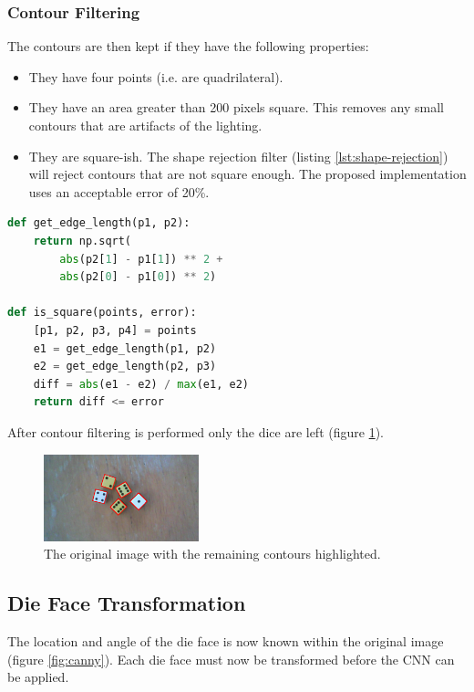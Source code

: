 \documentclass[conference]{IEEEtran}
\begin{document}
\subsubsection{Contour Filtering}
The contours are then kept if they have the following properties:
\begin{itemize}
	\item They have four points (i.e. are quadrilateral).
	\item They have an area greater than 200 pixels square. This removes any small contours that are artifacts of the lighting.
	\item They are square-ish. The shape rejection filter (listing \ref{lst:shape-rejection}) will reject contours that are not square enough.
		The proposed implementation uses an acceptable error of 20\%.
\end{itemize}
\begin{lstlisting}[language=python, caption={The shape rejection filter in Python.}, label={lst:shape-rejection}]
def get_edge_length(p1, p2):
    return np.sqrt(
    	abs(p2[1] - p1[1]) ** 2 +
    	abs(p2[0] - p1[0]) ** 2)

def is_square(points, error):
    [p1, p2, p3, p4] = points
    e1 = get_edge_length(p1, p2)
    e2 = get_edge_length(p2, p3)
    diff = abs(e1 - e2) / max(e1, e2)
    return diff <= error
\end{lstlisting}
After contour filtering is performed only the dice are left (figure \ref{fig:contour}). 
\begin{figure}
	\centering
	\includegraphics[width=0.4\textwidth]{contours}
	\caption{The original image with the remaining contours highlighted.}
	\label{fig:contour}
\end{figure}

\subsection{Die Face Transformation}

The location and angle of the die face is now known within the original image (figure \ref{fig:canny}).
Each die face must now be transformed before the CNN can be applied.
\end{document}
